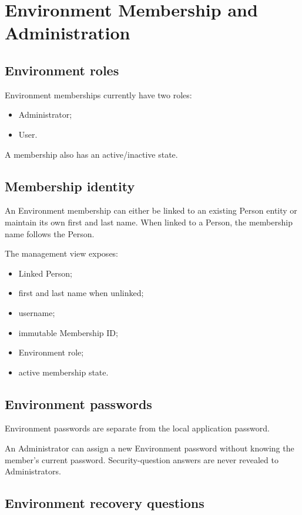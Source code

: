 \documentclass{testudomanual}
\begin{document}
\chapter{Environment Membership and Administration}

\section{Environment roles}

Environment memberships currently have two roles:
\begin{itemize}
    \item Administrator;
    \item User.
\end{itemize}

A membership also has an active/inactive state.

\section{Membership identity}

An Environment membership can either be linked to an existing Person entity or maintain its own first and last name. When linked to a Person, the membership name follows the Person.

The management view exposes:
\begin{itemize}
    \item Linked Person;
    \item first and last name when unlinked;
    \item username;
    \item immutable Membership ID;
    \item Environment role;
    \item active membership state.
\end{itemize}

\section{Environment passwords}

Environment passwords are separate from the local application password.

An Administrator can assign a new Environment password without knowing the member's current password. Security-question answers are never revealed to Administrators.

\section{Environment recovery questions}
\end{document}
